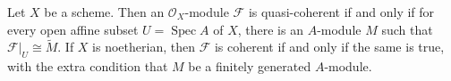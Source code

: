 Let $X$ be a scheme. Then an $\mathcal{O}_X$-module $\mathcal{F}$ is quasi-coherent if and only if for every open affine subset $U = \operatorname{Spec} A$ of $X$, there is an $A$-module $M$ such that $\mathcal{F}|_U \cong \tilde{M}$. If $X$ is noetherian, then $\mathcal{F}$ is coherent if and only if the same is true, with the extra condition that $M$ be a finitely generated $A$-module.
